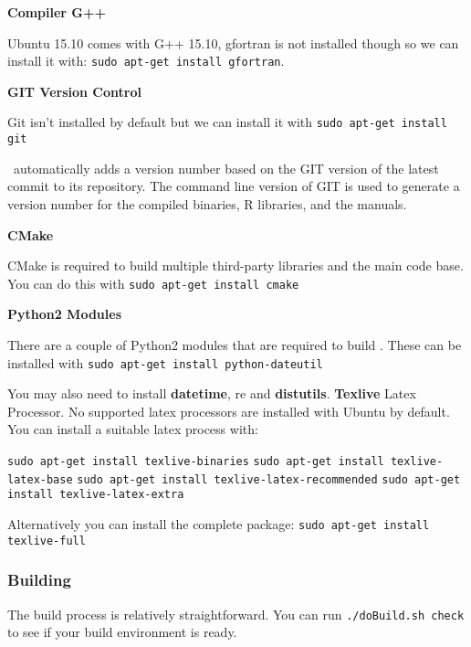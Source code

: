 \textbf{Compiler G++}

Ubuntu 15.10 comes with G++ 15.10, gfortran is not installed though so we can install it with: \texttt{sudo apt-get install gfortran}.

\textbf{GIT Version Control}

Git isn't installed by default but we can install it with \texttt{sudo apt-get install git}

\CNAME\ automatically adds a version number based on the GIT version of the latest commit to its repository. The command line version of GIT is used  to generate a version number for the compiled binaries, R libraries, and the manuals.

\textbf{CMake}

CMake is required to build multiple third-party libraries and the main code base. You can do this with \texttt{sudo apt-get install cmake}

\textbf{Python2 Modules}

There are a couple of Python2 modules that are required to build \CNAME. These can be installed with \texttt{sudo apt-get install python-dateutil}

You may also need to install \textbf{datetime}, re and \textbf{distutils}. \textbf{Texlive} Latex Processor. No supported latex processors are installed with Ubuntu by default. You can install a suitable latex process with:

\texttt{sudo apt-get install texlive-binaries}
\texttt{sudo apt-get install texlive-latex-base}
\texttt{sudo apt-get install texlive-latex-recommended}
\texttt{sudo apt-get install texlive-latex-extra}

Alternatively you can install the complete package:
\texttt{sudo apt-get install texlive-full}

\subsubsection{Building \CNAME}

The build process is relatively straightforward. You can run \texttt{./doBuild.sh check} to see if your build environment is ready.

